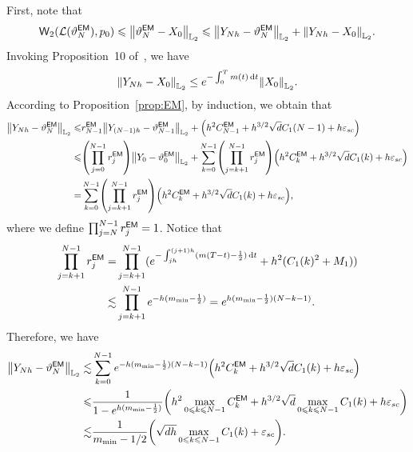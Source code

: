 First, note that
\begin{align*}
    \wass_2(\law(\vartheta_N^{\sf EM}),p_0)\leqslant \l|\vartheta_N^{\sf EM}-X_0\r|_{\Ltwo}\leqslant\l|Y_{Nh}-\vartheta_N^{\sf EM}\r|_{\Ltwo}+\l|Y_{Nh}-X_0\r|_{\Ltwo}.
\end{align*}
Invoking Proposition~10 of~\cite{gao2023wasserstein}, we have
\begin{align}
    \l|Y_{Nh}-X_0\r|_{\Ltwo}\leq e^{-\int_0^Tm(t)\rmd t}\l|X_0\r|_{\Ltwo}.
    \label{eq:Wassterm1}
\end{align}
According to Proposition~\ref{prop:EM}, by induction, we obtain that
\begin{equation}
    \begin{aligned}
        \l|Y_{Nh}-\vartheta_N^{\sf EM}\r|_{\Ltwo}\leqslant& r_{N-1}^{\sf EM}\l|Y_{(N-1)h}-\vartheta_{N-1}^{\sf EM}\r|_{\Ltwo}+\left(h^2C_{N-1}^{\sf EM}+h^{3/2}\sqrt{d}C_1(N-1)+h\varepsilon_{sc}\right)\\
        \leqslant&\left(\prod_{j=0}^{N-1}r_j^{\sf EM}\right)\l|Y_0-\vartheta_0^{\sf EM}\r|_{\Ltwo}+\sum_{k=0}^{N-1}\left(\prod_{j=k+1}^{N-1}r_j^{\sf EM}\right)\left(h^2C_k^{\sf EM}+h^{3/2}\sqrt{d}C_1(k)+h\varepsilon_{sc}\right)\\
        =&\sum_{k=0}^{N-1}\left(\prod_{j=k+1}^{N-1}r_j^{\sf EM}\right)\left(h^2C_k^{\sf EM}+h^{3/2}\sqrt{d}C_1(k)+h\varepsilon_{sc}\right),
    \end{aligned}
    \label{eq:Wassinduction}
\end{equation}
where we define $\prod_{j=N}^{N-1}r_j^{\sf EM}=1$.
Notice that 
\begin{align*}
    \prod_{j=k+1}^{N-1}r_j^{\sf EM}=&\prod_{j=k+1}^{N-1}(e^{-\int_{jh}^{(j+1)h}(m(T-t)-\frac{1}{2}){\,\rm d} t}+h^2(C_1(k)^2+M_1))\\
    \lesssim& \prod_{j=k+1}^{N-1}e^{-h(m_{\min}-\frac{1}{2})}=e^{h(m_{\min}-\frac{1}{2})(N-k-1)}.
\end{align*}
Therefore, we have
\begin{equation}
    \begin{aligned}
        \l|Y_{Nh}-\vartheta_N^{\sf EM}\r|_{\Ltwo}\lesssim& \sum_{k=0}^{N-1}e^{-h(m_{\min}-\frac{1}{2})(N-k-1)}\left(h^2C_k^{\sf EM}+h^{3/2}\sqrt{d}C_1(k)+h\varepsilon_{sc}\right)\\
        \leqslant& \dfrac{1}{1-e^{h(m_{\min}-\frac{1}{2})}}\left(h^2\max_{0\leqslant k\leqslant N-1}C_k^{\sf EM}+h^{3/2}\sqrt{d}\max_{0\leqslant k\leqslant N-1}C_1(k)+h\varepsilon_{sc}\right)\\
        \lesssim&\dfrac{1}{m_{\min}-1/2}\left(\sqrt{dh}\max_{0\leqslant k\leqslant N-1}C_1(k)+\varepsilon_{sc}\right).
    \end{aligned}
    \label{eq:Wassterm2}
\end{equation}
